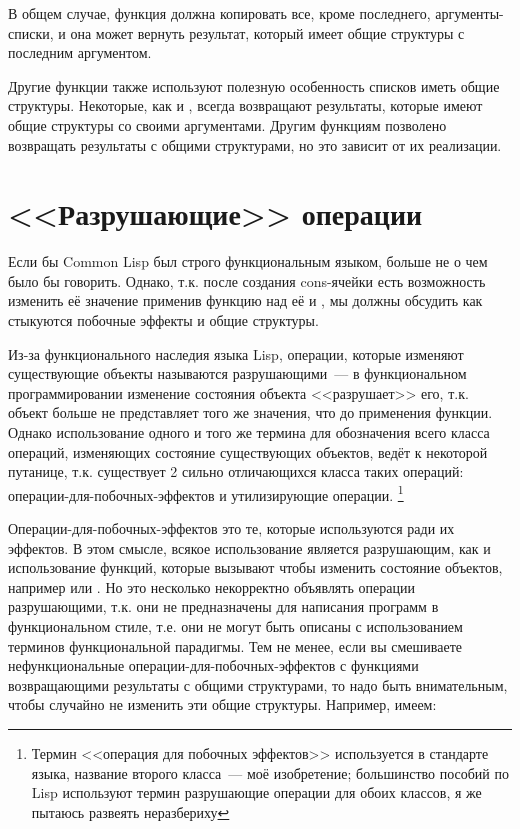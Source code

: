 
В общем случае, функция  должна копировать все, кроме последнего,
аргументы-списки, и она может вернуть результат, который имеет общие структуры с последним
аргументом.

Другие функции также используют полезную особенность списков иметь общие
структуры. Некоторые, как и , всегда возвращают результаты, которые имеют
общие структуры со своими аргументами. Другим функциям позволено возвращать результаты с
общими структурами, но это зависит от их реализации.

\section{<<Разрушающие>> операции}

Если бы Common Lisp был строго функциональным языком, больше не о чем было бы
говорить. Однако, т.к. после создания cons-ячейки есть возможность изменить её значение
применив функцию  над её  и , мы должны обсудить как
стыкуются побочные эффекты и общие структуры.

Из-за функционального наследия языка Lisp, операции, которые изменяют существующие объекты
называются разрушающими~--- в функциональном программировании изменение состояния объекта
<<разрушает>> его, т.к. объект больше не представляет того же значения, что до применения
функции. Однако использование одного и того же термина для обозначения всего класса
операций, изменяющих состояние существующих объектов, ведёт к некоторой путанице,
т.к. существует 2 сильно отличающихся класса таких операций:
операции-для-побочных-эффектов и утилизирующие операции. \footnote{Термин <<операция для
  побочных эффектов>> используется в стандарте языка, название второго класса~--- моё
  изобретение; большинство пособий по Lisp используют термин разрушающие операции для
  обоих классов, я же пытаюсь развеять неразбериху}

Операции-для-побочных-эффектов это те, которые используются ради их эффектов. В этом
смысле, всякое использование  является разрушающим, как и использование
функций, которые вызывают  чтобы изменить состояние объектов, например
 или . Но это несколько некорректно объявлять операции
разрушающими, т.к. они не предназначены для написания программ в функциональном стиле,
т.е. они не могут быть описаны с использованием терминов функциональной парадигмы. Тем не
менее, если вы смешиваете нефункциональные операции-для-побочных-эффектов с функциями
возвращающими результаты с общими структурами, то надо быть внимательным, чтобы случайно
не изменить эти общие структуры. Например, имеем:

